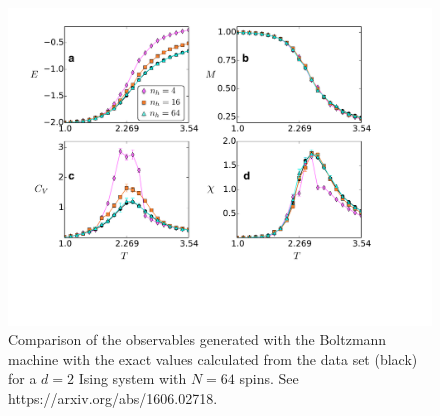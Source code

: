 \documentclass[letterpaper]{scrartcl}
\begin{document}
\begin{figure}[ht]
\centering
\includegraphics[width=135mm]{observables}
\caption{Comparison of the observables generated with the Boltzmann machine with the exact values calculated from the data set
(black) for a $d=2$ Ising system with $N=64$ spins.  See   {https://arxiv.org/abs/1606.02718}. }
\label{observables}
\end{figure}

\end{document}
